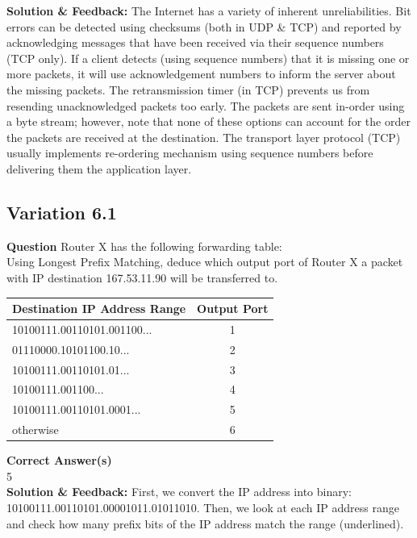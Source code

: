\textbf{Solution \& Feedback:}
{\color{red}
The Internet has a variety of inherent unreliabilities. Bit errors can be detected using checksums (both in UDP \& TCP) and reported by acknowledging messages that have been received via their sequence numbers (TCP only). If a client detects (using sequence numbers) that it is missing one or more packets, it will use acknowledgement numbers to inform the server about the missing packets. The retransmission timer (in TCP) prevents us from resending unacknowledged packets too early. The packets are sent in-order using a byte stream; however, note that none of these options can account for the order the packets are received at the destination. The transport layer protocol (TCP) usually implements re-ordering mechanism using sequence numbers before delivering them the application layer.
}
\subsection{Variation 6.1}

\textbf{Question} Router X has the following forwarding table:\\
Using Longest Prefix Matching, deduce which output port of Router X a packet with IP destination 167.53.11.90 will be transferred to. \\

\begin{tabular}{|l|c|}
    \hline
    \textbf{Destination IP Address Range} & \textbf{Output Port} \\
    \hline
     10100111.00110101.001100... & 1 \\
    \hline
     01110000.10101100.10... & 2 \\
    \hline
     10100111.00110101.01... & 3 \\
    \hline
     10100111.001100... & 4 \\
    \hline
     10100111.00110101.0001... & 5 \\
    \hline
     otherwise & 6\\
    \hline
\end{tabular}

\textbf{Correct Answer(s)}\\
5\\
\textbf{Solution \& Feedback:}
First, we convert the IP address into binary: 10100111.00110101.00001011.01011010.
Then, we look at each IP address range and check how many prefix bits of the IP address match the range (underlined).

